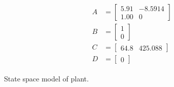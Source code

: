 \problem

\begin{captioneq}
	\centering
	\begin{align}
		\begin{split}
			A &=\begin{bmatrix}
				5.91  &-8.5914\\
				1.00  &                 0
			\end{bmatrix}\\
			B &=\begin{bmatrix}
				1\\0
			\end{bmatrix}\\
			C &= \begin{bmatrix}
				64.8 & 425.088
			\end{bmatrix}\\
			D &= \begin{bmatrix}
				0
			\end{bmatrix}
	\end{split}
	\end{align}
	\caption{State space model of plant.}
\end{captioneq}
